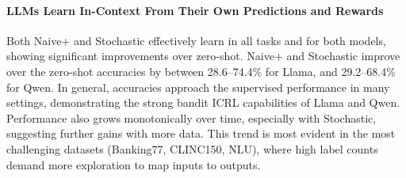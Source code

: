 \documentclass{article}
\theoremstyle{plain}
\theoremstyle{definition}
\theoremstyle{remark}
\newcommand{\llama}{Llama\xspace}
\newcommand{\qwen}{Qwen\xspace}
\newcommand{\banking}{Banking77\xspace}
\newcommand{\clinic}{CLINC150\xspace}
\newcommand{\nlu}{NLU\xspace}
\newcommand{\naiveplusshort}{Naive+\xspace}
\newcommand{\expshort}{Stochastic\xspace}
\begin{document}
\paragraph{LLMs Learn In-Context From Their Own Predictions and Rewards}
Both \naiveplusshort and \expshort effectively learn in all tasks and for both models, showing significant improvements over zero-shot.
\naiveplusshort and \expshort improve over the zero-shot  accuracies by between 28.6--74.4\% for \llama, and 29.2--68.4\% for \qwen.
In general, accuracies approach the supervised performance in many settings, demonstrating the strong bandit ICRL capabilities of \llama and \qwen.
Performance also grows monotonically over time, especially with \expshort,  suggesting further gains with more data. This trend is most evident in the most challenging datasets (\banking, \clinic, \nlu), where high label counts demand more exploration to map inputs to outputs.
\end{document}
